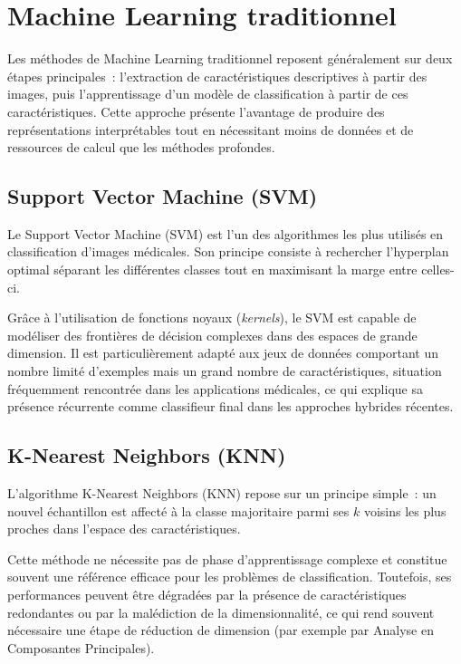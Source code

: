 \section{Machine Learning traditionnel}

Les méthodes de Machine Learning traditionnel reposent généralement sur deux étapes
principales~: l'extraction de caractéristiques descriptives à partir des images, puis
l'apprentissage d'un modèle de classification à partir de ces caractéristiques. Cette
approche présente l'avantage de produire des représentations interprétables tout en
nécessitant moins de données et de ressources de calcul que les méthodes profondes.

\subsection{Support Vector Machine (SVM)}

Le Support Vector Machine (SVM) est l'un des algorithmes les plus utilisés en classification
d'images médicales. Son principe consiste à rechercher l'hyperplan optimal séparant les
différentes classes tout en maximisant la marge entre celles-ci.

Grâce à l'utilisation de fonctions noyaux (\emph{kernels}), le SVM est capable de modéliser
des frontières de décision complexes dans des espaces de grande dimension. Il est
particulièrement adapté aux jeux de données comportant un nombre limité d'exemples mais un
grand nombre de caractéristiques, situation fréquemment rencontrée dans les applications
médicales, ce qui explique sa présence récurrente comme classifieur final dans les approches
hybrides récentes.

\subsection{K-Nearest Neighbors (KNN)}

L'algorithme K-Nearest Neighbors (KNN) repose sur un principe simple~: un nouvel échantillon
est affecté à la classe majoritaire parmi ses $k$ voisins les plus proches dans l'espace des
caractéristiques.

Cette méthode ne nécessite pas de phase d'apprentissage complexe et constitue souvent une
référence efficace pour les problèmes de classification. Toutefois, ses performances peuvent
être dégradées par la présence de caractéristiques redondantes ou par la malédiction de la
dimensionnalité, ce qui rend souvent nécessaire une étape de réduction de dimension (par
exemple par Analyse en Composantes Principales).

